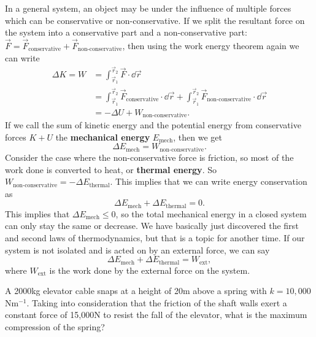 \documentclass[../classical_mechanics.tex]{subfiles}
\begin{document}
        In a general system, an object may be under the influence of multiple forces which can be conservative or non-conservative.
        If we split the resultant force on the system into a conservative part and a non-conservative part: $\vec{F}=\vec{F}_\text{conservative}+\vec{F}_\text{non-conservative}$, then using the work energy theorem again we can write
        \begin{align}
            \Delta K=W&=\int_{\vec{r}_1}^{\vec{r}_2}\vec{F}\cdot\dd{\vec{r}}\\
            &=\int_{\vec{r}_1}^{\vec{r}_2}\vec{F}_\text{conservative}\cdot\dd{\vec{r}}+\int_{\vec{r}_1}^{\vec{r}_2}\vec{F}_\text{non-conservative}\cdot\dd{\vec{r}}\\
            &=-\Delta U+W_\text{non-conservative}.
        \end{align}
        If we call the sum of kinetic energy and the potential energy from conservative forces $K+U$ the \textbf{mechanical energy} $E_\text{mech}$, then we get
        \begin{equation}
            \Delta E_\text{mech}=W_\text{non-conservative}.
        \end{equation}
        Consider the case where the non-conservative force is friction, so most of the work done is converted to heat, or \textbf{thermal energy}.
        So $W_\text{non-conservative}=-\Delta E_\text{thermal}$.
        This implies that we can write energy conservation as
        \begin{equation}
            \Delta E_\text{mech}+\Delta E_\text{thermal}=0.
        \end{equation}
        This implies that $\Delta E_\text{mech}\leq 0$, so the total mechanical energy in a closed system can only stay the same or decrease.
        We have basically just discovered the first and second laws of thermodynamics, but that is a topic for another time.
        If our system is not isolated and is acted on by an external force, we can say
        \begin{equation}
            \Delta E_\text{mech}+\Delta E_\text{thermal}=W_\text{ext},
        \end{equation}
        where $W_\text{ext}$ is the work done by the external force on the system.
        \begin{example}
            A 2000kg elevator cable snaps at a height of 20m above a spring with $k=10,000$Nm$^{-1}$.
            Taking into consideration that the friction of the shaft walls exert a constant force of 15,000N to resist the fall of the elevator, what is the maximum compression of the spring?
        \end{example}
\end{document}
